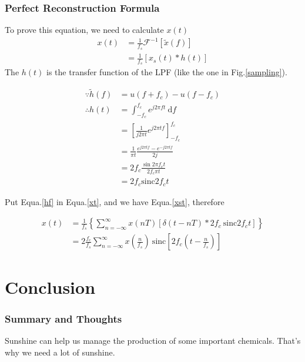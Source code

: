 \documentclass{article}
\begin{document}
\subsubsection*{Perfect Reconstruction Formula}

To prove this equation, we need to calculate $x(t)$
\begin{align}
    x(t) & = \frac{1}{f_s} \mathcal{F}^{-1} \left[ \widetilde{x}(f) \right] \nonumber \\
         & = \frac{1}{f_s} \left[ x_s(t) * h(t) \right] \label{xt}
\end{align}
The $h(t)$ is the transfer function of the LPF (like the one in Fig.\ref{sampling}).

\begin{align}
    \because \widetilde{h}(f) & = u(f + f_c) - u(f - f_c)\nonumber                                        \\
    \therefore h(t)           & = \int_{-f_c}^{f_c} e^{j2 \pi ft} ~ \mathrm{d}f \nonumber                 \\
                              & = \left[ \frac{1}{j2 \pi t} e^{j2 \pi t f} \right]_{-f_c }^{f_c}\nonumber \\
                              & = \frac{1}{\pi t} \frac{e^{j2 \pi t f} - e^{- j2 \pi t f}}{2j}\nonumber   \\
                              & = 2f_c \frac{\sin 2\pi f_c t}{2f_c \pi t} \nonumber                       \\
                              & = 2f_c \mathrm{sinc} 2f_c t \label{hf}
\end{align}

Put Equa.\ref{hf} in Equa.\ref{xt}, and we have Equa.\ref{xst}, therefore

\begin{align}
    x(t) & = \frac{1}{f_s} \left\{ \sum_{n = -\infty}^{\infty} x(nT) \left[ \delta(t - nT) * 2f_c ~ \mathrm{sinc} 2f_c t \right] \right\}\nonumber \\
         & = 2 \frac{f_c}{f_s} \sum_{n = -\infty}^{\infty}  x(\frac{n}{f_s}) ~ \mathrm{sinc}\left[ 2f_c(t - \frac{n}{f_s}) \right]
\end{align}

\section{Conclusion}
    \subsubsection*{Summary and Thoughts}
    Sunshine can help us manage the production of some important chemicals. That's why we need a lot of sunshine.
\end{document}
